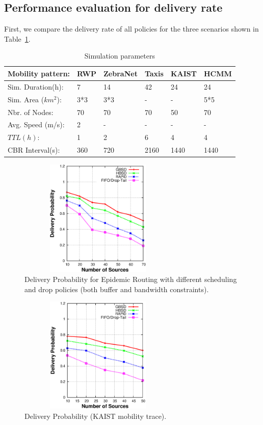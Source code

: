 \subsection{Performance evaluation for delivery rate}
\label{sec:sims:DR}

First, we compare the delivery rate of all policies for the three scenarios shown in Table~\ref{SP}.

\begin{table}[!h]
\renewcommand{\arraystretch}{1.1}
\caption{Simulation parameters}
\centering
\begin{tabular}{|p{4cm}|p{1.5cm}|p{1.5cm}|p{1.5cm}|p{1.5cm}|p{1.5cm}|}
\hline
\bfseries Mobility pattern: & RWP & ZebraNet & Taxis & KAIST& HCMM \\
\hline
Sim. Duration(h):& 7 & 14 & 42 & 24 & 24\\
\hline
Sim. Area ($km^2$):& 3*3 & 3*3 & - & - & 5*5\\
\hline
Nbr. of Nodes: & 70 & 70 & 70 & 50 & 70\\
\hline
Avg. Speed (m/s):& 2 & - & - & - & -\\
\hline
$TTL(h)$:& 1 & 2 & 6 & 4 & 4\\
\hline
CBR Interval(s):& 360 & 720 & 2160 & 1440& 1440\\
\hline
\end{tabular}
\label{SP}
\end{table}

\begin{figure}[!h]
\centering
\includegraphics[width=3in,height=2.2in]{Chapitre3/fig2.eps}
\small
\caption{Delivery Probability for Epidemic Routing with different scheduling and drop policies (both buffer and bandwidth constraints).}\normalsize
\label{DR-RWP}
\end{figure}

\begin{figure}[!h]
\centering
\includegraphics[width=3in,height=2.2in]{Chapitre3/fig22.eps}
\small
\caption{Delivery Probability (KAIST mobility trace).}
\normalsize
\label{DR-KAIST}
\end{figure}

